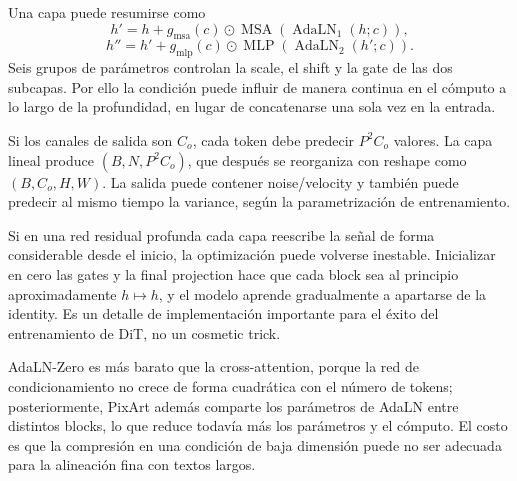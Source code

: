 Una capa puede resumirse como
\[
h'=h+g_{\mathrm{msa}}(c)\odot
\operatorname{MSA}(\operatorname{AdaLN}_1(h;c)),
\]
\[
h''=h'+g_{\mathrm{mlp}}(c)\odot
\operatorname{MLP}(\operatorname{AdaLN}_2(h';c)).
\]
Seis grupos de parámetros controlan la scale, el shift y la gate de las dos subcapas. Por ello la condición puede influir de manera continua en el cómputo a lo largo de la profundidad, en lugar de concatenarse una sola vez en la entrada.


Si los canales de salida son $C_o$, cada token debe predecir $P^2C_o$ valores. La capa lineal produce $(B,N,P^2C_o)$, que después se reorganiza con reshape como $(B,C_o,H,W)$. La salida puede contener noise/velocity y también puede predecir al mismo tiempo la variance, según la parametrización de entrenamiento.


Si en una red residual profunda cada capa reescribe la señal de forma considerable desde el inicio, la optimización puede volverse inestable. Inicializar en cero las gates y la final projection hace que cada block sea al principio aproximadamente $h\mapsto h$, y el modelo aprende gradualmente a apartarse de la identity. Es un detalle de implementación importante para el éxito del entrenamiento de DiT, no un cosmetic trick.


AdaLN-Zero es más barato que la cross-attention, porque la red de condicionamiento no crece de forma cuadrática con el número de tokens; posteriormente, PixArt además comparte los parámetros de AdaLN entre distintos blocks, lo que reduce todavía más los parámetros y el cómputo. El costo es que la compresión en una condición de baja dimensión puede no ser adecuada para la alineación fina con textos largos.


